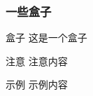 \documentclass{ctexbeamer}
\begin{document}
\begin{frame}
    \frametitle{一些盒子}
    \begin{block}{盒子}
        这是一个盒子
    \end{block}
    \begin{alertblock}{注意}
        注意内容
    \end{alertblock}
    \begin{exampleblock}{示例}
        示例内容
    \end{exampleblock}
\end{frame}
\end{document}
